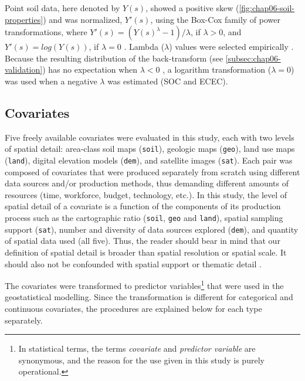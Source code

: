 Point soil data, here denoted by $Y(s)$, showed a positive skew (\autoref{fig:chap06-soil-properties}) and was 
normalized, $Y'(s)$, using the Box-Cox family of power transformations, where $Y'(s) = (Y(s)^{\lambda} - 1) / 
\lambda$, if $\lambda > 0$, and $Y'(s) = log(Y(s))$, if $\lambda = 0$ \cite{DiggleEtAl2007}. Lambda 
($\lambda$) values were selected empirically \cite{FoxEtAl2011}. Because the resulting distribution of the 
back-transform (see \autoref{subsec:chap06-validation}) has no expectation when $\lambda < 0$ 
\cite{RibeiroEtAl2001}, a logarithm transformation ($\lambda = 0$) was used when a negative $\lambda$ was 
estimated (SOC and ECEC).

\subsection{Covariates}
\label{subsec:chap06-sources}

Five freely available covariates were evaluated in this study, each with two levels of spatial detail: 
area-class soil maps (\texttt{soil}), geologic maps (\texttt{geo}), land use maps (\texttt{land}), digital 
elevation models (\texttt{dem}), and satellite images (\texttt{sat}). Each pair was composed of covariates 
that were produced separately from scratch using different data sources and/or production methods, thus 
demanding different amounts of resources (time, workforce, budget, technology, etc.). In this study, the level 
of spatial detail of a covariate is a function of the components of its production process such as the 
cartographic ratio (\texttt{soil}, \texttt{geo} and \texttt{land}), spatial sampling support (\texttt{sat}), 
number and diversity of data sources explored (\texttt{dem}), and quantity of spatial data used (all five). 
Thus, the reader should bear in mind that our definition of spatial detail is broader than spatial resolution 
or spatial scale. It should also not be confounded with spatial support \cite{WebsterEtAl2007} or thematic 
detail \cite{Rossiter2000}.

\def\footcovars{\footnote{In statistical terms, the terms \emph{covariate} and \emph{predictor variable} are 
synonymous, and the reason for the use given in this study is purely operational.}}

The covariates were transformed to predictor variables\footcovars{} that were used in the geostatistical 
modelling. Since the transformation is different for categorical and continuous covariates, the procedures are 
explained below for each type separately.


